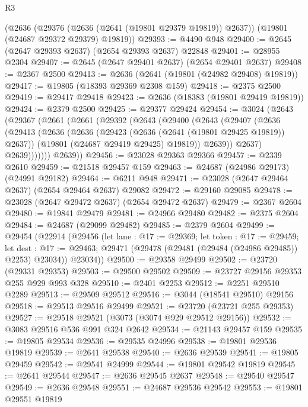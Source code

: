 \begin{lexlean}{R3}
\begin{coremodule}
    (@2636
      (@29376 (@2636 (@2641 (@19801 @29379 @19819)) @2637))
      (@19801 (@24687 @29372 @29379) @19819))
@29393 := @4490 @948
@29400 := @2645 (@2647 @29393 @2637) (@2654 @29393 @2637) @22848
@29401 := @28955 @2304
@29407 := @2645 (@2647 @29401 @2637) (@2654 @29401 @2637)
@29408 := @2367 @2500
@29413 := @2636 (@2641 (@19801 (@24982 @29408) @19819))
@29417 := @19805 (@18393 @29369 @2308 @159)
@29418 := @2375 @2500
@29419 := @29417 @29418
@29423 := @2636 (@18383 (@19801 @29419 @19819))
@29424 := @2379 @2500
@29425 := @29377 @29424
@29454 := @3024
    (@2643
      (@29367
        (@2661
          (@2661
            (@29392
              (@2643
                (@29400
                  (@2643
                    (@29407
                      (@2636
                        (@29413
                          (@2636
                            (@2636
                              (@29423 (@2636 (@2641 (@19801 @29425 @19819)) @2637))
                              (@19801 (@24687 @29419 @29425) @19819))
                            @2639))
                        @2637)
                      @2639)))))))
        @2639))
@29456 := @23028 @29363 @29366
@29457 := @2339 @2610
@29459 := @21518 @29457 @159
@29463 := @24687 (@24986 @29173) (@24991 @29182)
@29464 := @6211 @948
@29471 := @23028 (@2647 @29464 @2637) (@2654 @29464 @2637) @29082
@29472 := @29160 @29085
@29478 := @23028 (@2647 @29472 @2637) (@2654 @29472 @2637)
@29479 := @2367 @2604
@29480 := @19841 @29479
@29481 := @24966 @29480
@29482 := @2375 @2604
@29484 := @24687 (@29099 @29482)
@29485 := @2379 @2604
@29499 := @29454
    (@22914
      (@29456
        (let lane : @17 := @29369;
        let token : @17 := @29459;
        let dest : @17 := @29463; @29471 (@29478 (@29481 (@29484 (@24986 @29485)) @2253) @23034))
        @23034))
@29500 := @29358 @29499
@29502 := @23720 (@29331 @29353)
@29503 := @29500 @29502
@29509 := @23727 @29156 @29353 @255 @929 @993 @328
@29510 := @2401 @2253
@29512 := @2251 @29510 @2289
@29513 := @29509 @29512
@29516 := @3044 (@18541 @29510) @29156
@29518 := @29513 @29516 @29499
@29521 := @23720 (@23721 @255 @29353)
@29527 := @29518 @29521 (@3073 (@3074 @929 @29512 @29156))
@29532 := @3083 @29516 @536 @991 @324 @2642
@29534 := @21143 @29457 @159
@29535 := @19805 @29534
@29536 := @29535 @24996
@29538 := @19801 @29536 @19819
@29539 := @2641 @29538
@29540 := @2636 @29539
@29541 := @19805 @29459
@29542 := @29541 @24999
@29544 := @19801 @29542 @19819
@29545 := @2641 @29544
@29547 := @2636 @29545 @2637
@29548 := @29540 @29547
@29549 := @2636 @29548
@29551 := @24687 @29536 @29542
@29553 := @19801 @29551 @19819

\end{coremodule}
\end{lexlean}
